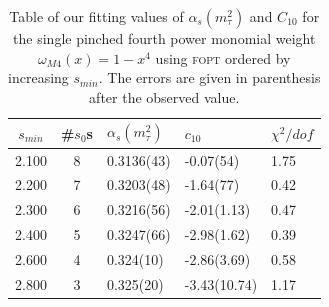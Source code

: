 \documentclass[../../index.tex]{subfiles}
\begin{document}
\begin{table}
  \centering
  \begin{tabularx}{\textwidth}{ccYYY}
    \toprule
    \(s_{min}\) & \#\(s_0\)s & \(\alpha_s(m_\tau^2)\) & \(c_{10}\) & \(\chi^2/dof\)  \\
    \midrule
    2.100 & 8  & 0.3136(43) & -0.07(54) & 1.75 \\
    2.200 & 7  & 0.3203(48) & -1.64(77) & 0.42 \\
    2.300 & 6  & 0.3216(56) & -2.01(1.13) & 0.47 \\
    2.400 & 5  & 0.3247(66) & -2.98(1.62) & 0.39 \\
    2.600 & 4  & 0.324(10) & -2.86(3.69) & 0.58 \\
    2.800 & 3  & 0.325(20) & -3.43(10.74) & 1.17 \\
    \bottomrule
  \end{tabularx}
  \caption{Table of our fitting values of \(\alpha_s(m_\tau^2)\) and \(C_{10}\)
    for the single pinched fourth power monomial weight \(\omega_{M4}(x)=1-x^4\)
    using \textsc{fopt} ordered by increasing \(s_{min}\). The errors are given
    in parenthesis after the observed value.}
  \label{table:fitM4AlD10}
\end{table}
\end{document}
